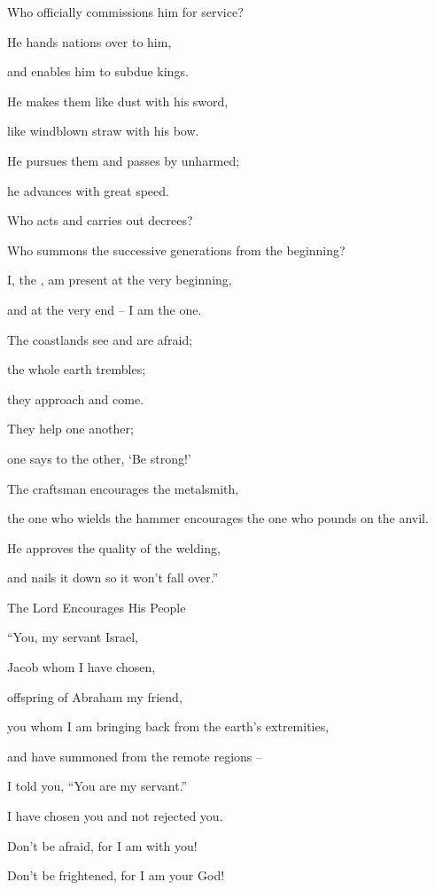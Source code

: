 {\par }{\Q Who officially
commissions
him for service?

\par }{\Q He hands nations
over
to him,

\par }{\Q and enables him to subdue
kings.
\par }{\Q He
makes
them like dust
with his sword,
\par }{\Q like windblown
straw
with his bow.
\par }{\Q {}He pursues
them and passes by
unharmed;
\par }{\Q he advances
with great speed.
\par }{\Q {}Who
acts and carries
out decrees?

\par }{\Q Who summons
the successive
generations
from the beginning?
\par }{\Q I,
the {}, am present at the very beginning,
\par }{\Q and at the very end
– I am the one.
\par }{\Q {}The coastlands
see
and are afraid;
\par }{\Q the whole
earth
trembles;
\par }{\Q they approach
and come.
\par }{\Q {}They help
one
another;
\par }{\Q one says
to the other,
‘Be strong!’
\par }{\Q {}The craftsman
encourages
the metalsmith,
\par }{\Q the one who wields
the hammer
encourages the one who pounds
on the anvil.
\par }{\Q He approves
the quality
of the welding,
\par }{\Q and nails
it down
so it won’t
fall over.”
\par }{\SH The Lord Encourages His People
\par }{\Q {}“You,
my servant
Israel,
\par }{\Q Jacob
whom
I have chosen,
\par }{\Q offspring
of Abraham
my friend,
\par }{\Q {}you whom
I am bringing back
from the earth’s
extremities,
\par }{\Q and have summoned
from the remote regions
–
\par }{\Q I told
you, “You
are my servant.”
\par }{\Q I have chosen
you and not
rejected you.
\par }{\Q {}Don’t
be afraid,
for
I
am with you!
\par }{\Q Don’t
be frightened,
for I
am your God!

}
